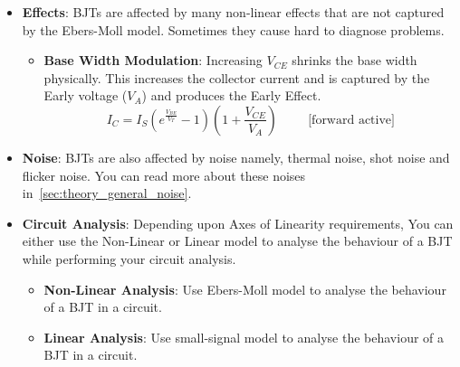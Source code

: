 \begin{itemize}
\begin{itemize}
    \end{itemize}
  \item \textbf{Effects}:
    BJTs are affected by many non-linear effects that are not captured by
    the Ebers-Moll model. Sometimes they cause hard to diagnose problems.
    \begin{itemize}
        \item \textbf{Base Width Modulation}: Increasing \(V_{CE}\) shrinks the base
          width physically. This increases the collector current and is captured
          by the Early voltage (\(V_A\)) and produces the Early Effect.
          \[
            I_C = I_{S} \left( e^{\frac{V_{BE}}{V_T}} - 1 \right) \left( 1 + \frac{V_{CE}}{V_A} \right) \hspace{1cm} \text{[forward active]}
          \]
    \end{itemize}
  \item \textbf{Noise}:
      BJTs are also affected by noise namely, thermal noise, shot noise and flicker
      noise. You can read more about these noises in~\ref{sec:theory_general_noise}.
  \item \textbf{Circuit Analysis}:
    Depending upon Axes of Linearity requirements, You can either use the
    Non-Linear or Linear model to analyse the behaviour of a BJT while
    performing your circuit analysis.
    \begin{itemize}
      \item \textbf{Non-Linear Analysis}:
        Use Ebers-Moll model to analyse the behaviour of a BJT in a circuit.
      \item \textbf{Linear Analysis}:
        Use small-signal model to analyse the behaviour of a BJT in a circuit.
    \end{itemize}
\end{itemize}
